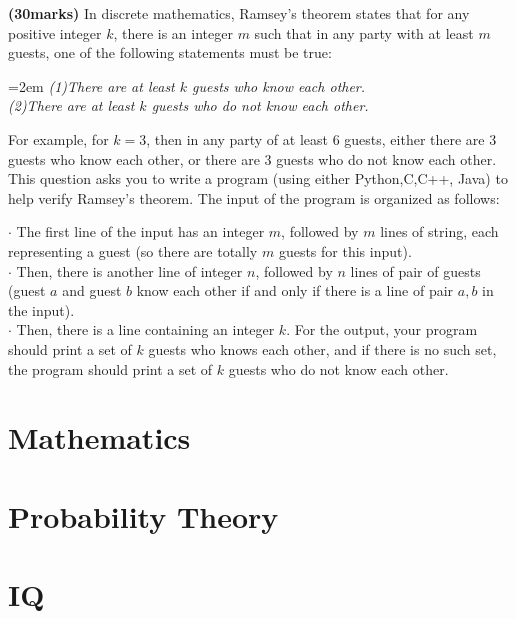 \documentclass{article}
\begin{document}
\vspace{2\baselineskip}

\noindent \textbf{(30marks)} In discrete mathematics, Ramsey's theorem states that for any positive integer $k$, there is an integer $m$ such that in any party with at least $m$ guests, one of the following statements must be true:

\hangindent=2em %
\textit{(1)There are at least $k$ guests who know each other.}\\
\textit{(2)There are at least $k$ guests who do not know each other.}

For example, for $k=3$, then in any party of at least 6 guests, either there are 3 guests who know each other, or there are 3 guests who do not know each other. This question asks you to write a program (using either Python,C,C++, Java) to help verify Ramsey's theorem. The input of the program is organized as follows:


\indent $\cdot$ The first line of the input has an integer $m$, followed by $m$ lines of string, each representing a guest (so there are totally $m$ guests for this input).\\
\indent $\cdot$ Then, there is another line of integer $n$, followed by $n$ lines of pair of guests (guest $a$ and guest $b$ know each other if and only if there is a line of pair $a, b$ in the input).\\
\indent $\cdot$ Then, there is a line containing an integer $k$.
For the output, your program should print a set of $k$ guests who knows each other, and if there is no such set, the program should print a set of $k$ guests who do not know each other.



\section{Mathematics}



\section{Probability Theory}



\section{IQ}
\end{document}
